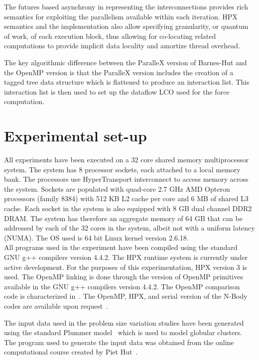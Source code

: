 \documentclass[floatfix]{revtex4}
\begin{document}
The futures based asynchrony in representing the interconnections provides rich
semantics for exploiting the parallelism available within each iteration.
HPX semantics and the implementation
also allow specifying granularity, or quantum of work, of each execution block, 
thus allowing for co-locating related computations
to provide implicit data locality and amortize thread overhead.

The key algorithmic difference between the ParalleX version of Barnes-Hut and 
the OpenMP version is that the ParalleX version includes the creation 
of a tagged tree data structure which is flattened to produce an interaction list. This interaction list
is then used to set up the dataflow LCO used for the force computation.




\section{Experimental set-up}
\label{experiment_setup}

All experiments have been executed on a
32 core shared memory multiprocessor system. The system has 8 processor 
sockets, each attached to a local memory bank. The processors
use HyperTransport interconnect to access memory
across the system. Sockets are populated with quad-core 2.7 GHz AMD
Opteron processors (family 8384) with 512 KB L2 cache per core and
6 MB of shared L3 cache. 
Each socket in the system is also equipped with 8 GB dual channel DDR2 DRAM. 
The system has therefore an aggregate memory of 64 GB that can be addressed 
by each of the 32 cores in the system, albeit not with a uniform latency (NUMA).
The OS used is 64 bit Linux kernel version 2.6.18.\\

All programs used in the experiment have been
compiled using the standard GNU g++ compilers version 4.4.2. The HPX
runtime system is currently under active development. For the purposes
of this experimentation, HPX version 3 is used. The OpenMP linking is
done through the version of OpenMP primitives available in the GNU g++
compilers version 4.4.2.
The OpenMP comparison code is characterized in~\cite{chiragsthesis}. The
OpenMP, HPX, and serial version of the N-Body codes are available upon 
request~\cite{nbody_download}.

The input data used in the problem size variation studies have been generated using
the standard Plummer model~\cite{plummer} which is used to model globular clusters.
The program used to generate the input data was obtained from the 
online computational course created by Piet Hut~\cite{directnb}.
\end{document}
